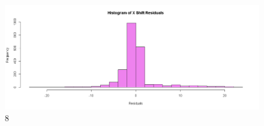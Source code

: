 \documentclass[
]{article}
\begin{document}
\begin{figure}
\centering
\includegraphics{../results/png/Hist_X.png}
\caption{8}
\end{figure}
\end{document}
